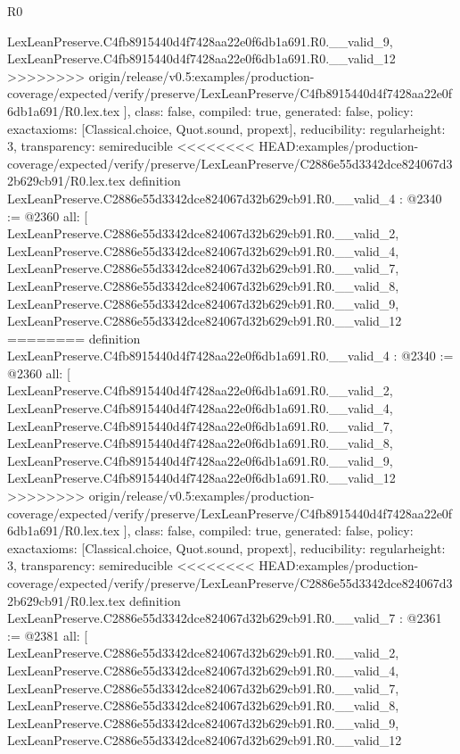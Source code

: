 \begin{lexlean}{R0}
\begin{coremodule}
{{{{{{{{{{{{{{{{{{{{{{{{{{{{{{{{{{{{{{{{{{{{{    LexLeanPreserve.C4fb8915440d4f7428aa22e0f6db1a691.R0.__valid_9,
    LexLeanPreserve.C4fb8915440d4f7428aa22e0f6db1a691.R0.__valid_12
>>>>>>>> origin/release/v0.5:examples/production-coverage/expected/verify/preserve/LexLeanPreserve/C4fb8915440d4f7428aa22e0f6db1a691/R0.lex.tex
  ],
  class: false,
  compiled: true,
  generated: false,
  policy: exact{axioms: [Classical.choice, Quot.sound, propext]},
  reducibility: regular{height: 3},
  transparency: semireducible
}
<<<<<<<< HEAD:examples/production-coverage/expected/verify/preserve/LexLeanPreserve/C2886e55d3342dce824067d32b629cb91/R0.lex.tex
definition LexLeanPreserve.C2886e55d3342dce824067d32b629cb91.R0.__valid_4 : @2340 := @2360 {
  all: [
    LexLeanPreserve.C2886e55d3342dce824067d32b629cb91.R0.__valid_2,
    LexLeanPreserve.C2886e55d3342dce824067d32b629cb91.R0.__valid_4,
    LexLeanPreserve.C2886e55d3342dce824067d32b629cb91.R0.__valid_7,
    LexLeanPreserve.C2886e55d3342dce824067d32b629cb91.R0.__valid_8,
    LexLeanPreserve.C2886e55d3342dce824067d32b629cb91.R0.__valid_9,
    LexLeanPreserve.C2886e55d3342dce824067d32b629cb91.R0.__valid_12
========
definition LexLeanPreserve.C4fb8915440d4f7428aa22e0f6db1a691.R0.__valid_4 : @2340 := @2360 {
  all: [
    LexLeanPreserve.C4fb8915440d4f7428aa22e0f6db1a691.R0.__valid_2,
    LexLeanPreserve.C4fb8915440d4f7428aa22e0f6db1a691.R0.__valid_4,
    LexLeanPreserve.C4fb8915440d4f7428aa22e0f6db1a691.R0.__valid_7,
    LexLeanPreserve.C4fb8915440d4f7428aa22e0f6db1a691.R0.__valid_8,
    LexLeanPreserve.C4fb8915440d4f7428aa22e0f6db1a691.R0.__valid_9,
    LexLeanPreserve.C4fb8915440d4f7428aa22e0f6db1a691.R0.__valid_12
>>>>>>>> origin/release/v0.5:examples/production-coverage/expected/verify/preserve/LexLeanPreserve/C4fb8915440d4f7428aa22e0f6db1a691/R0.lex.tex
  ],
  class: false,
  compiled: true,
  generated: false,
  policy: exact{axioms: [Classical.choice, Quot.sound, propext]},
  reducibility: regular{height: 3},
  transparency: semireducible
}
<<<<<<<< HEAD:examples/production-coverage/expected/verify/preserve/LexLeanPreserve/C2886e55d3342dce824067d32b629cb91/R0.lex.tex
definition LexLeanPreserve.C2886e55d3342dce824067d32b629cb91.R0.__valid_7 : @2361 := @2381 {
  all: [
    LexLeanPreserve.C2886e55d3342dce824067d32b629cb91.R0.__valid_2,
    LexLeanPreserve.C2886e55d3342dce824067d32b629cb91.R0.__valid_4,
    LexLeanPreserve.C2886e55d3342dce824067d32b629cb91.R0.__valid_7,
    LexLeanPreserve.C2886e55d3342dce824067d32b629cb91.R0.__valid_8,
    LexLeanPreserve.C2886e55d3342dce824067d32b629cb91.R0.__valid_9,
    LexLeanPreserve.C2886e55d3342dce824067d32b629cb91.R0.__valid_12
}}}}}}}}}}}}}}}}}}}}}}}}}}}}}}}}}}}}}}}}}}}}}}
\end{coremodule}
\end{lexlean}
